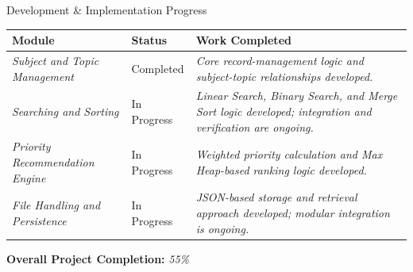 \documentclass[aspectratio=169,11pt]{beamer}
\newcommand{\placeholder}[1]{%
\textit{\color{GEUGrey}#1}
}
\begin{document}
\begin{frame}{Development \& Implementation Progress}

\scriptsize

\begin{center}

\renewcommand{\arraystretch}{1.25}

\begin{tabularx}{.96\textwidth}
{@{}p{3cm}p{2.2cm}X@{}}

\toprule
\textbf{Module} &
\textbf{Status} &
\textbf{Work Completed}\\
\midrule

\placeholder{Subject and Topic Management} &
Completed &
\placeholder{Core record-management logic and subject-topic relationships developed.}\\

\placeholder{Searching and Sorting} &
In Progress &
\placeholder{Linear Search, Binary Search, and Merge Sort logic developed; integration and verification are ongoing.}\\

\placeholder{Priority Recommendation Engine} &
In Progress &
\placeholder{Weighted priority calculation and Max Heap-based ranking logic developed.}\\

\placeholder{File Handling and Persistence} &
In Progress &
\placeholder{JSON-based storage and retrieval approach developed; modular integration is ongoing.}\\

\bottomrule

\end{tabularx}

\end{center}

\vspace{3mm}

\begin{center}
\colorbox{GEULightBlue}{
\parbox{.65\textwidth}{
\centering
\textbf{Overall Project Completion:}
\placeholder{55\%}
}}
\end{center}

\vfill



\end{frame}
\end{document}
